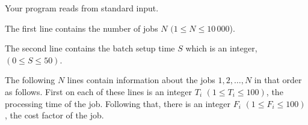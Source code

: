Your program reads from standard input. 

The first line contains the number of jobs $N$ $(1 \le N \le 10\,000$). 

The second line contains the batch setup time $S$ which is an integer, $(0 \le S \le 50)$.

The following $N$ lines contain information about the jobs $1, 2, \ldots, N$ in that order
as follows. First on each of these lines is an integer $T_i$ $(1 \le T_i \le 100)$, the processing time of the job. Following that, there is an integer $F_i$ $(1 \le F_i \le 100)$, the cost factor of the job.